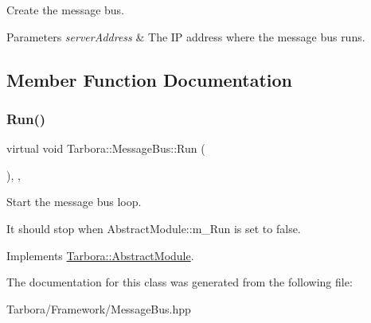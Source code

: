 Create the message bus. 


\begin{DoxyParams}{Parameters}
{\em server\+Address} & The IP address where the message bus runs. \\
\hline
\end{DoxyParams}


\subsection{Member Function Documentation}
\mbox{\label{classTarbora_1_1MessageBus_a1de6d06fd522da0c19c4b4889a26e5dd}} 
\subsubsection{\texorpdfstring{Run()}{Run()}}
{\footnotesize\ttfamily virtual void Tarbora\+::\+Message\+Bus\+::\+Run (\begin{DoxyParamCaption}{ }\end{DoxyParamCaption})\hspace{0.3cm}{\ttfamily [inline]}, {\ttfamily [override]}, {\ttfamily [virtual]}}



Start the message bus loop. 

It should stop when Abstract\+Module\+::m\+\_\+\+Run is set to false. 

Implements \hyperlink{classTarbora_1_1AbstractModule_abc4de331276ff78b18efafe14498bf21}{Tarbora\+::\+Abstract\+Module}.



The documentation for this class was generated from the following file\+:\begin{DoxyCompactItemize}
\item 
Tarbora/\+Framework/Message\+Bus.\+hpp\end{DoxyCompactItemize}
